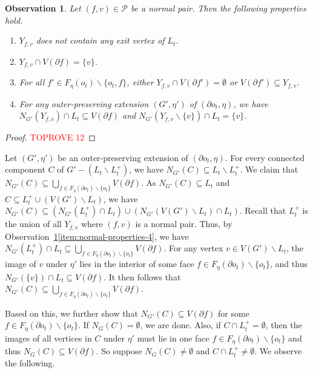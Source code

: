 \documentclass[a4paper,11pt]{article}
\numberwithin{lemma}{section}
\newtheorem{observation}[lemma]{Observation}
\begin{document}
\begin{observation} \label{obs-normalprop}
Let $(f,v) \in \mathcal{P}$ be a normal pair.
Then the following properties hold.
\begin{enumerate}[label = (\alph*)]
 \item\label{item:normal-properties-1} $Y_{f,v}$ does not contain any exit vertex of $L_t$.
 \item\label{item:normal-properties-2} $Y_{f,v} \cap V(\partial f) = \{v\}$.
 \item\label{item:normal-properties-3} For all $f' \in F_\eta(o_t) \backslash \{o_t,f\}$, either $Y_{f,v} \cap V(\partial f') = \emptyset$ or $V(\partial f') \subseteq Y_{f,v}$.
 \item\label{item:normal-properties-4} For any outer-preserving extension $(G',\eta')$ of $(\partial o_t,\eta)$, we have $N_{G'}(Y_{f,v}) \cap L_t \subseteq V(\partial f)$ and $N_{G'}(Y_{f,v} \backslash \{v\}) \cap L_t = \{v\}$.
\end{enumerate}
\end{observation}

\begin{proof}\textcolor{red}{TOPROVE 12}\end{proof}

Let $(G',\eta')$ be an outer-preserving extension of $(\partial o_t,\eta)$.
For every connected component $C$ of $G' - (L_t \backslash L_t^+)$, we have $N_{G'}(C) \subseteq L_t \backslash L_t^+$.
We claim that $N_{G'}(C) \subseteq \bigcup_{f \in F_\eta(\partial o_t) \backslash \{o_t\}} V(\partial f)$.
As $N_{G'}(C) \subseteq L_t$ and $C \subseteq L_t^+ \cup (V(G') \backslash L_t)$, we have $N_{G'}(C) \subseteq (N_{G'}(L_t^+) \cap L_t) \cup (N_{G'}(V(G') \backslash L_t) \cap L_t)$.
Recall that $L_t^+$ is the union of all $Y_{f,v}$ where $(f,v)$ is a normal pair.
Thus, by Observation~\ref{obs-normalprop}\ref{item:normal-properties-4}, we have $N_{G'}(L_t^+) \cap L_t \subseteq \bigcup_{f \in F_\eta(\partial o_t) \backslash \{o_t\}} V(\partial f)$.
For any vertex $v \in V(G') \backslash L_t$, the image of $v$ under $\eta'$ lies in the interior of some face $f \in F_\eta(\partial o_t) \backslash \{o_t\}$, and thus $N_{G'}(\{v\}) \cap L_t \subseteq V(\partial f)$.
It then follows that $N_{G'}(C) \subseteq \bigcup_{f \in F_\eta(\partial o_t) \backslash \{o_t\}} V(\partial f)$.

Based on this, we further show that $N_{G'}(C) \subseteq V(\partial f)$ for some $f \in F_\eta(\partial o_t) \backslash \{o_t\}$.
If $N_G(C) = \emptyset$, we are done.
Also, if $C \cap L_t^+ = \emptyset$, then the images of all vertices in $C$ under $\eta'$ must lie in one face $f \in F_\eta(\partial o_t) \backslash \{o_t\}$ and thus $N_G(C) \subseteq V(\partial f)$.
So suppose $N_G(C) \neq \emptyset$ and $C \cap L_t^+ \neq \emptyset$.
We observe the following.
\end{document}
